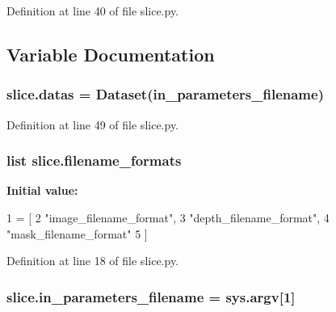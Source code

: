 Definition at line 40 of file slice.\+py.



\subsection{Variable Documentation}
\subsubsection[{\texorpdfstring{datas}{datas}}]{\setlength{\rightskip}{0pt plus 5cm}slice.\+datas = {\bf Dataset}({\bf in\+\_\+parameters\+\_\+filename})}\hypertarget{namespaceslice_a17ebf104aabeed4f05a67326d8a8c3f1}{}\label{namespaceslice_a17ebf104aabeed4f05a67326d8a8c3f1}


Definition at line 49 of file slice.\+py.

\subsubsection[{\texorpdfstring{filename\+\_\+formats}{filename_formats}}]{\setlength{\rightskip}{0pt plus 5cm}list slice.\+filename\+\_\+formats}\hypertarget{namespaceslice_aebcb39fc7f02a12d61c8045af43157e3}{}\label{namespaceslice_aebcb39fc7f02a12d61c8045af43157e3}
{\bfseries Initial value\+:}
\begin{DoxyCode}
1 = [
2     \textcolor{stringliteral}{"image\_filename\_format"},
3     \textcolor{stringliteral}{"depth\_filename\_format"},
4     \textcolor{stringliteral}{"mask\_filename\_format"}
5 ]
\end{DoxyCode}


Definition at line 18 of file slice.\+py.

\subsubsection[{\texorpdfstring{in\+\_\+parameters\+\_\+filename}{in_parameters_filename}}]{\setlength{\rightskip}{0pt plus 5cm}slice.\+in\+\_\+parameters\+\_\+filename = sys.\+argv\mbox{[}1\mbox{]}}\hypertarget{namespaceslice_aa2f432535d0edfe6db111302bb8d9469}{}\label{namespaceslice_aa2f432535d0edfe6db111302bb8d9469}



